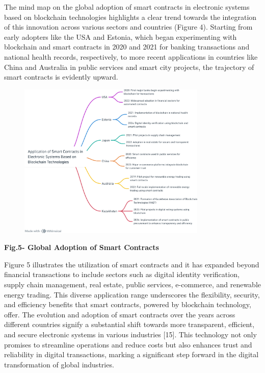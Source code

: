 The mind map on the global adoption of smart contracts in electronic
systems based on blockchain technologies highlights a clear trend
towards the integration of this innovation across various sectors and
countries (Figure 4). Starting from early adopters like the USA and
Estonia, which began experimenting with blockchain and smart contracts
in 2020 and 2021 for banking transactions and national health records,
respectively, to more recent applications in countries like China and
Australia in public services and smart city projects, the trajectory of
smart contracts is evidently upward.

\begin{figure}[H]
	\centering
	\includegraphics[width=0.8\textwidth]{assets/82}
	\caption*{}
\end{figure}

\textbf{Fig.5- Global Adoption of Smart Contracts}

Figure 5 illustrates the utilization of smart contracts and it has
expanded beyond financial transactions to include sectors such as
digital identity verification, supply chain management, real estate,
public services, e-commerce, and renewable energy trading. This diverse
application range underscores the flexibility, security, and efficiency
benefits that smart contracts, powered by blockchain technology, offer.
The evolution and adoption of smart contracts over the years across
different countries signify a substantial shift towards more
transparent, efficient, and secure electronic systems in various
industries {[}15{]}. This technology not only promises to streamline
operations and reduce costs but also enhances trust and reliability in
digital transactions, marking a significant step forward in the digital
transformation of global industries.

